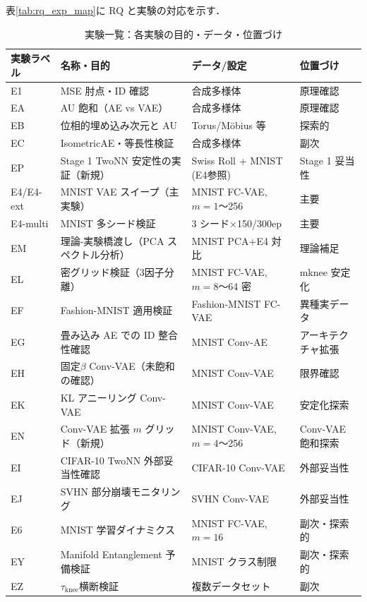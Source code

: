 \documentclass[11pt,a4paper]{jsarticle}
\begin{document}
表\ref{tab:rq_exp_map}に RQ と実験の対応を示す．

\begin{table}[H]
\centering
\caption{実験一覧：各実験の目的・データ・位置づけ}
\label{tab:exp_list}
\small
\begin{tabular}{llll}
\toprule
実験ラベル & 名称・目的 & データ/設定 & 位置づけ \\
\midrule
E1 & MSE 肘点・ID 確認 & 合成多様体 & 原理確認 \\
EA & AU 飽和（AE vs VAE） & 合成多様体 & 原理確認 \\
EB & 位相的埋め込み次元と AU & Torus/Möbius 等 & 探索的 \\
EC & IsometricAE・等長性検証 & 合成多様体 & 副次 \\
EP & Stage 1 TwoNN 安定性の実証（新規） & Swiss Roll + MNIST (E4参照) & Stage 1 妥当性 \\
E4/E4-ext & MNIST VAE スイープ（主実験） & MNIST FC-VAE, $m=1$〜256 & 主要 \\
E4-multi & MNIST 多シード検証 & 3 シード×150/300ep & 主要 \\
EM & 理論-実験橋渡し（PCA スペクトル分析） & MNIST PCA+E4 対比 & 理論補足 \\
EL & 密グリッド検証（3因子分離） & MNIST FC-VAE, $m=8$〜64 密 & mknee 安定化 \\
EF & Fashion-MNIST 適用検証 & Fashion-MNIST FC-VAE & 異種実データ \\
EG & 畳み込み AE での ID 整合性確認 & MNIST Conv-AE & アーキテクチャ拡張 \\
EH & 固定$\beta$ Conv-VAE（未飽和の確認） & MNIST Conv-VAE & 限界確認 \\
EK & KL アニーリング Conv-VAE & MNIST Conv-VAE & 安定化探索 \\
EN & Conv-VAE 拡張 $m$ グリッド（新規） & MNIST Conv-VAE, $m=4$〜256 & Conv-VAE 飽和探索 \\
EI & CIFAR-10 TwoNN 外部妥当性確認 & CIFAR-10 Conv-VAE & 外部妥当性 \\
EJ & SVHN 部分崩壊モニタリング & SVHN Conv-VAE & 外部妥当性 \\
E6 & MNIST 学習ダイナミクス & MNIST FC-VAE, $m=16$ & 副次・探索的 \\
EY & Manifold Entanglement 予備検証 & MNIST クラス制限 & 副次・探索的 \\
EZ & $\tau_\mathrm{knee}$横断検証 & 複数データセット & 副次 \\
\bottomrule
\end{tabular}
\end{table}
\end{document}
